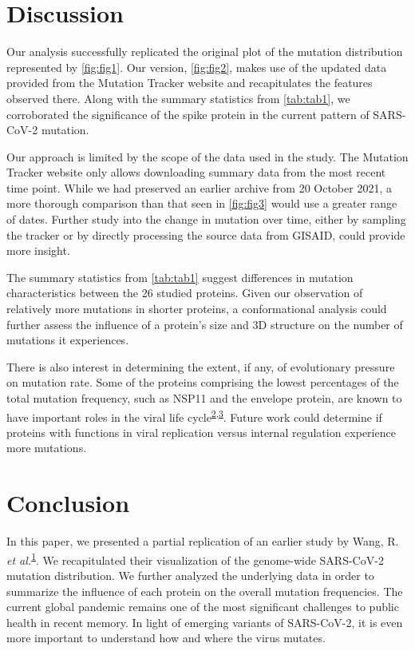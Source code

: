 \documentclass{article}
\begin{document}
\hypertarget{discussion}{%
\section{Discussion}\label{discussion}}

Our analysis successfully replicated the original plot of the mutation
distribution represented by \autoref{fig:fig1}. Our version,
\autoref{fig:fig2}, makes use of the updated data provided from the
Mutation Tracker website and recapitulates the features observed there.
Along with the summary statistics from \autoref{tab:tab1}, we
corroborated the significance of the spike protein in the current
pattern of SARS-CoV-2 mutation.

Our approach is limited by the scope of the data used in the study. The
Mutation Tracker website only allows downloading summary data from the
most recent time point. While we had preserved an earlier archive from
20 October 2021, a more thorough comparison than that seen in
\autoref{fig:fig3} would use a greater range of dates. Further study
into the change in mutation over time, either by sampling the tracker or
by directly processing the source data from GISAID, could provide more
insight.

The summary statistics from \autoref{tab:tab1} suggest differences in
mutation characteristics between the 26 studied proteins. Given our
observation of relatively more mutations in shorter proteins, a
conformational analysis could further assess the influence of a
protein's size and 3D structure on the number of mutations it
experiences.

There is also interest in determining the extent, if any, of
evolutionary pressure on mutation rate. Some of the proteins comprising
the lowest percentages of the total mutation frequency, such as NSP11
and the envelope protein, are known to have important roles in the viral
life
cycle\textsuperscript{\protect\hyperlink{ref-Zhang2016}{2},\protect\hyperlink{ref-Schoeman2019}{3}}.
Future work could determine if proteins with functions in viral
replication versus internal regulation experience more mutations.

\hypertarget{conclusion}{%
\section{Conclusion}\label{conclusion}}

In this paper, we presented a partial replication of an earlier study by
Wang, R. \emph{et
al.}\textsuperscript{\protect\hyperlink{ref-Wang2021}{1}}. We
recapitulated their visualization of the genome-wide SARS-CoV-2 mutation
distribution. We further analyzed the underlying data in order to
summarize the influence of each protein on the overall mutation
frequencies. The current global pandemic remains one of the most
significant challenges to public health in recent memory. In light of
emerging variants of SARS-CoV-2, it is even more important to understand
how and where the virus mutates.
\end{document}
